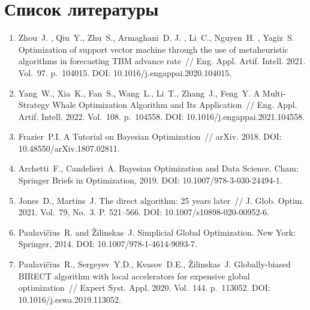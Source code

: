 \documentclass[a4paper,12pt,russian]{article}
\begin{document}
\section*{Список литературы}
\begin{enumerate}

\item \label{rfa:rulit:Zhou2021}
Zhou~J. , Qiu~Y.,  Zhu~S., Armaghani~D. J. , Li~C., Nguyen~H. , Yagiz~S. Optimization of support vector machine through the use of metaheuristic algorithms in forecasting {TBM} advance rate~// Eng. Appl. Artif. Intell. 2021. Vol.~97. p.~104015.  DOI: 10.1016/j.engappai.2020.104015.

\item \label{rfa:rulit:Yang2022}
Yang~W., Xia~K., Fan~S., Wang~L., Li~T., Zhang~J., Feng~Y. A Multi-Strategy Whale Optimization Algorithm and Its Application~// Eng. Appl. Artif. Intell. 2022. Vol.~108. p.~104558. DOI: 10.1016/j.engappai.2021.104558.

\item \label{rfa:rulit:Frazier2018}
Frazier~P.I. A Tutorial on Bayesian Optimization~// arXiv. 2018. DOI: 10.48550/arXiv.1807.02811.

\item \label{rfa:rulit:Archetti2019}
Archetti~F., Candelieri~A. Bayesian Optimization and Data Science. Cham: Springer Briefs in Optimization, 2019. DOI: 10.1007/978-3-030-24494-1.

\item \label{rfa:rulit:Jones2021}
Jones~D., Martins~J. The direct algorithm: 25 years later~// J. Glob. Optim. 2021. Vol.~79, No.~3. P. 521--566. DOI: 10.1007/s10898-020-00952-6.

\item \label{rfa:rulit:PaulaviciusZilinskas2014}
Paulavi{\v c}ius~R. and {\v Z}ilinskas~J. Simplicial Global Optimization. New York: Springer, 2014. DOI: 10.1007/978-1-4614-9093-7.

\item \label{rfa:rulit:Birect2020}
Paulavi{\v c}ius~R., Sergeyev~Y.D., Kvasov~D.E., {\v Z}ilinskas~J. Globally-biased {BIRECT} algorithm with local accelerators for expensive global optimization~// Expert Syst. Appl. 2020. Vol.~144. p.~113052. DOI: 10.1016/j.eswa.2019.113052.


\end{enumerate}
\end{document}
